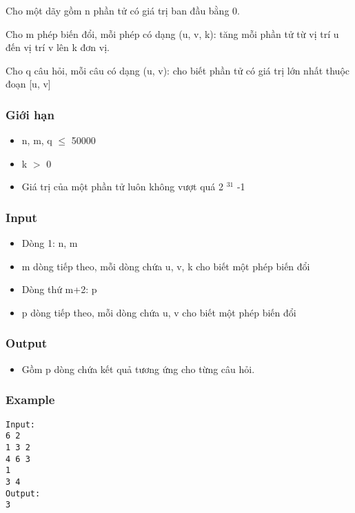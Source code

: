 



   Cho một dãy gồm n phần tử có giá trị ban đầu bằng 0.  

   Cho m phép biến đổi, mỗi phép có dạng (u, v, k): tăng mỗi phần tử từ vị trí u đến vị trí v lên k đơn vị.  

   Cho q câu hỏi, mỗi câu có dạng (u, v): cho biết phần tử có giá trị lớn nhất thuộc đoạn [u, v]  

\subsubsection{   Giới hạn  }
\begin{itemize}
	\item     n, m, q  $\le$  50000   
	\item     k $>$ 0   
	\item     Giá trị của một phần tử luôn không vượt quá 2    $^     31    $    -1   
\end{itemize}

\subsubsection{   Input  }
\begin{itemize}
	\item     Dòng 1: n, m   
	\item     m dòng tiếp theo, mỗi dòng chứa u, v, k cho biết một phép biến đổi   
	\item     Dòng thứ m+2: p   
	\item     p dòng tiếp theo, mỗi dòng chứa u, v cho biết một phép biến đổi    
\\
\end{itemize}

\subsubsection{   Output  }
\begin{itemize}
	\item     Gồm p dòng chứa kết quả tương ứng cho từng câu hỏi.   
\end{itemize}

\subsubsection{   Example  }
\begin{verbatim}
Input:
6 2
1 3 2
4 6 3
1
3 4
Output:
3
\end{verbatim}
